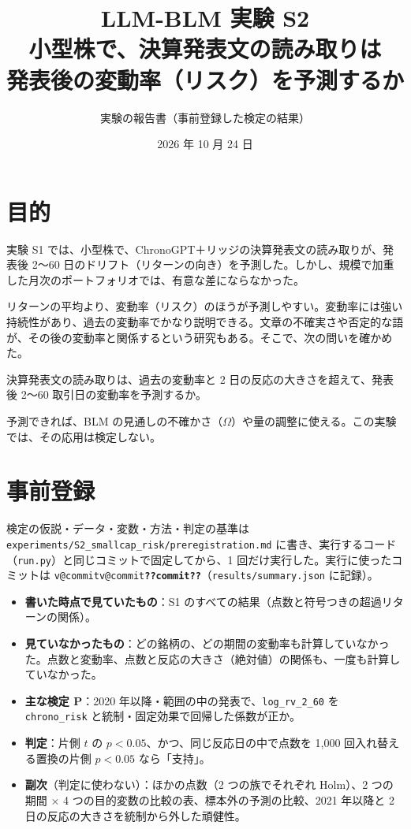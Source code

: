 \documentclass[xelatex,ja=standard,jafont=haranoaji,a4paper,10pt,openany]{bxjsreport}
\title{LLM-BLM 実験 S2\\[6pt]
  \large 小型株で、決算発表文の読み取りは\\発表後の変動率（リスク）を予測するか}
\author{実験の報告書（事前登録した検定の結果）}
\date{2026 年 10 月 24 日}
\makeatletter
\newcommand{\V}[1]{\ifcsname v@#1\endcsname\csname v@#1\endcsname\else\textbf{??#1??}\fi}
\newcommand{\code}[1]{\texttt{#1}}
\makeatother
\begin{document}
\maketitle



\setcounter{tocdepth}{1}
{\small\tableofcontents}

\chapter{目的}\label{ch:purpose}

実験 S1 では、小型株で、ChronoGPT＋リッジの決算発表文の読み取りが、発表後 2〜60 日のドリフト（リターンの向き）を予測した。しかし、規模で加重した月次のポートフォリオでは、有意な差にならなかった。

リターンの平均より、変動率（リスク）のほうが予測しやすい。変動率には強い持続性があり、過去の変動率でかなり説明できる。文章の不確実さや否定的な語が、その後の変動率と関係するという研究もある。そこで、次の問いを確かめた。

\begin{keybox}[問い]
決算発表文の読み取りは、過去の変動率と 2 日の反応の大きさを超えて、発表後 2〜60 取引日の変動率を予測するか。
\end{keybox}

予測できれば、BLM の見通しの不確かさ（$\Omega$）や量の調整に使える。この実験では、その応用は検定しない。

\chapter{事前登録}\label{ch:prereg}

検定の仮説・データ・変数・方法・判定の基準は \code{experiments/S2\_smallcap\_risk/preregistration.md} に書き、実行するコード（\code{run.py}）と同じコミットで固定してから、1 回だけ実行した。実行に使ったコミットは \code{\V{commit}}（\code{results/summary.json} に記録）。

\begin{itemize}
\item \textbf{書いた時点で見ていたもの}：S1 のすべての結果（点数と符号つきの超過リターンの関係）。
\item \textbf{見ていなかったもの}：どの銘柄の、どの期間の変動率も計算していなかった。点数と変動率、点数と反応の大きさ（絶対値）の関係も、一度も計算していなかった。
\item \textbf{主な検定 P}：2020 年以降・範囲の中の発表で、\code{log\_rv\_2\_60} を \code{chrono\_risk} と統制・固定効果で回帰した係数が正か。
\item \textbf{判定}：片側 $t$ の $p < 0.05$、かつ、同じ反応日の中で点数を 1,000 回入れ替える置換の片側 $p < 0.05$ なら「支持」。
\item \textbf{副次}（判定に使わない）：ほかの点数（2 つの族でそれぞれ Holm）、2 つの期間 × 4 つの目的変数の比較の表、標本外の予測の比較、2021 年以降と 2 日の反応の大きさを統制から外した頑健性。
\end{itemize}
\end{document}
